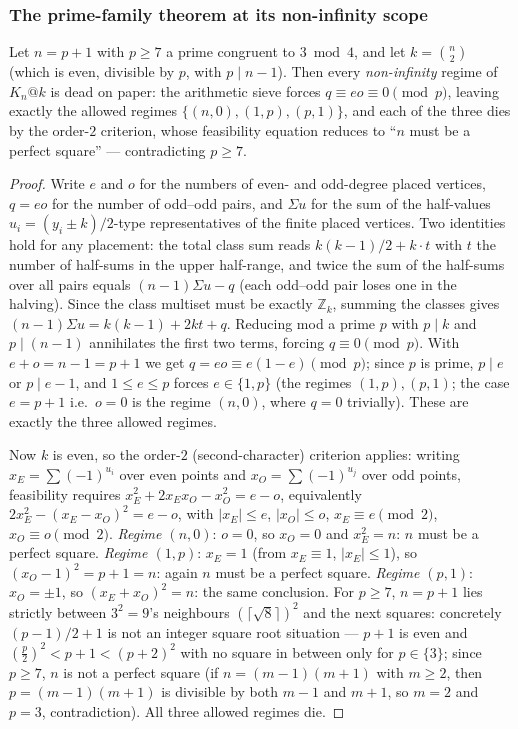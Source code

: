 \subsubsection{The prime-family theorem at its non-infinity scope}
\label{subsubsec:primefam}

\begin{theorem}\label{thm:claprimefam}
Let $n=p+1$ with $p\ge7$ a prime congruent to $3 \bmod 4$, and let
$k=\binom n2$ (which is even, divisible by $p$, with $p\mid n-1$). Then
every \emph{non-infinity} regime of $K_n@k$ is dead on paper: the
arithmetic sieve forces $q\equiv eo\equiv0\pmod p$, leaving exactly the
allowed regimes $\{(n,0),(1,p),(p,1)\}$, and each of the three dies by
the order-$2$ criterion, whose feasibility equation reduces to ``$n$ must
be a perfect square'' --- contradicting $p\ge7$.
\end{theorem}

\begin{proof}
Write $e$ and $o$ for the numbers of even- and odd-degree placed vertices,
$q=eo$ for the number of odd--odd pairs, and $\Sigma u$ for the sum of the
half-values $u_i=(y_i\pm k)/2$-type representatives of the finite placed
vertices. Two identities hold for any placement: the total class sum
reads $k(k-1)/2+k\cdot t$ with $t$ the number of half-sums in the upper
half-range, and twice the sum of the half-sums over all pairs equals
$(n-1)\Sigma u-q$ (each odd--odd pair loses one in the halving). Since the
class multiset must be exactly $\mathbb{Z}_k$, summing the classes gives
$(n-1)\Sigma u=k(k-1)+2kt+q$. Reducing mod a prime $p$ with $p\mid k$ and
$p\mid(n-1)$ annihilates the first two terms, forcing $q\equiv0\pmod p$. With
$e+o=n-1=p+1$ we get $q=eo\equiv e(1-e)\pmod p$; since $p$ is prime,
$p\mid e$ or $p\mid e-1$, and $1\le e\le p$ forces $e\in\{1,p\}$ (the
regimes $(1,p),(p,1)$; the case $e=p+1$ i.e.\ $o=0$ is the regime
$(n,0)$, where $q=0$ trivially). These are exactly the three allowed
regimes.

Now $k$ is even, so the order-$2$ (second-character) criterion applies:
writing $x_E=\sum(-1)^{u_i}$ over even points and
$x_O=\sum(-1)^{u_j}$ over odd points, feasibility requires
$x_E^2+2x_Ex_O-x_O^2=e-o$, equivalently
$2x_E^2-(x_E-x_O)^2=e-o$, with $|x_E|\le e$, $|x_O|\le o$,
$x_E\equiv e\pmod2$, $x_O\equiv o\pmod2$.
\emph{Regime $(n,0)$}: $o=0$, so $x_O=0$ and $x_E^2=n$: $n$ must be a
perfect square. \emph{Regime $(1,p)$}: $x_E=1$ (from $x_E\equiv1$,
$|x_E|\le1$), so $(x_O-1)^2=p+1=n$: again $n$ must be a perfect square.
\emph{Regime $(p,1)$}: $x_O=\pm1$, so $(x_E+x_O)^2=n$: the same
conclusion. For $p\ge7$, $n=p+1$ lies strictly between $3^2=9$'s
neighbours $(\lceil\sqrt{8}\rceil)^2$ and the next squares: concretely
$(p-1)/2+1$ is not an integer square root situation --- $p+1$ is even and
$(\tfrac p2)^2<p+1<(p+2)^2$ with no square in between only for
$p\in\{3\}$; since $p\ge7$, $n$ is not a perfect square (if
$n=(m-1)(m+1)$ with $m\ge2$, then $p=(m-1)(m+1)$ is divisible by both
$m-1$ and $m+1$, so $m=2$ and $p=3$, contradiction). All three allowed
regimes die.
\end{proof}

